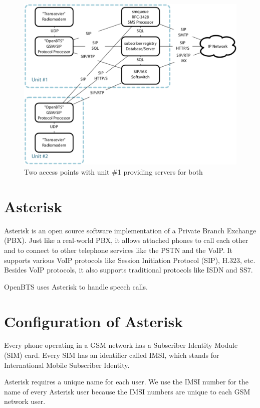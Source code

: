 \begin{figure}
  \centering
    \includegraphics[width=\textwidth]{../images/btsLarge}
  \caption[OpenBTS network with two access points]{Two access points with unit 
  \#1 providing servers for both \protect\cite{openbtsMan}}
  \label{fig:btsLarge}
\end{figure}


\section{Asterisk}
Asterisk is an open source software implementation of a Private Branch
Exchange (PBX). Just like a real-world PBX, it allows attached phones to call
each other and to connect to other telephone services like the PSTN and the 
VoIP. It supports various VoIP protocols like Session Initiation Protocol (SIP),
H.323, etc. Besides VoIP protocols, it also supports traditional protocols 
like ISDN and SS7.

OpenBTS uses Asterisk to handle speech calls.

\section{Configuration of Asterisk}
Every phone operating in a GSM network has a Subscriber Identity Module (SIM)
card. Every SIM has an identifier called IMSI, which stands for International
Mobile Subscriber Identity.

Asterisk requires a unique name for each user. We use the IMSI
number for the name of every Asterisk user because the IMSI numbers are unique
to each GSM network user.

